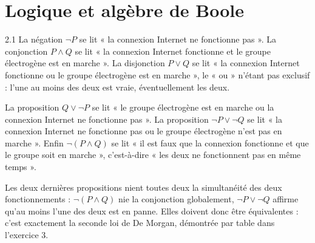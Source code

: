 \clearpage
\chapter{Logique et algèbre de Boole}

\begin{corrige}{2.1}
La négation $\lnot P$ se lit « la connexion Internet ne fonctionne pas ». La conjonction $P \land Q$ se lit « la connexion Internet fonctionne et le groupe électrogène est en marche ». La disjonction $P \lor Q$ se lit « la connexion Internet fonctionne ou le groupe électrogène est en marche », le « ou » n'étant pas exclusif : l'une au moins des deux est vraie, éventuellement les deux.

La proposition $Q \lor \lnot P$ se lit « le groupe électrogène est en marche ou la connexion Internet ne fonctionne pas ». La proposition $\lnot P \lor \lnot Q$ se lit « la connexion Internet ne fonctionne pas ou le groupe électrogène n'est pas en marche ». Enfin $\lnot (P \land Q)$ se lit « il est faux que la connexion fonctionne et que le groupe soit en marche », c'est-à-dire « les deux ne fonctionnent pas en même temps ».

Les deux dernières propositions nient toutes deux la simultanéité des deux fonctionnements : $\lnot (P \land Q)$ nie la conjonction globalement, $\lnot P \lor \lnot Q$ affirme qu'au moins l'une des deux est en panne. Elles doivent donc être équivalentes : c'est exactement la seconde loi de De Morgan, démontrée par table dans l'exercice 3.
\end{corrige}

